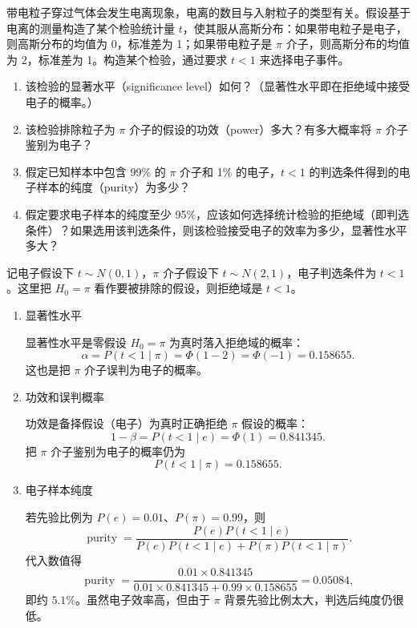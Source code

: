 ﻿


\begin{question}
带电粒子穿过气体会发生电离现象，电离的数目与入射粒子的类型有关。假设基于电离的测量构造了某个检验统计量
\(t\)，使其服从高斯分布：如果带电粒子是电子，则高斯分布的均值为
0，标准差为 1；如果带电粒子是 \(\pi\) 介子，则高斯分布的均值为
2，标准差为 1。构造某个检验，通过要求 \(t<1\) 来选择电子事件。

\begin{enumerate}
\item 该检验的显著水平（significance
level）如何？（显著性水平即在拒绝域中接受电子的概率。）

\item 该检验排除粒子为 \(\pi\)
介子的假设的功效（power）多大？有多大概率将 \(\pi\) 介子鉴别为电子？

\item 假定已知样本中包含 99\% 的 \(\pi\) 介子和 1\% 的电子，\(t<1\)
的判选条件得到的电子样本的纯度（purity）为多少？

\item 假定要求电子样本的纯度至少
95\%，应该如何选择统计检验的拒绝域（即判选条件）？如果选用该判选条件，则该检验接受电子的效率为多少，显著性水平多大？
\end{enumerate}
\begin{solution}
记电子假设下 \(t\sim N(0,1)\)，\(\pi\) 介子假设下
\(t\sim N(2,1)\)，电子判选条件为 \(t<1\)。这里把
\(H_0=\pi\) 看作要被排除的假设，则拒绝域是 \(t<1\)。

\begin{enumerate}
\item 显著性水平

显著性水平是零假设 \(H_0=\pi\) 为真时落入拒绝域的概率：
\[
\alpha=P(t<1\mid\pi)=\Phi(1-2)=\Phi(-1)=0.158655.
\]
这也是把 \(\pi\) 介子误判为电子的概率。

\item 功效和误判概率

功效是备择假设（电子）为真时正确拒绝 \(\pi\) 假设的概率：
\[
1-\beta=P(t<1\mid e)=\Phi(1)=0.841345.
\]
把 \(\pi\) 介子鉴别为电子的概率仍为
\[
P(t<1\mid\pi)=0.158655.
\]

\item 电子样本纯度

若先验比例为 \(P(e)=0.01\)、\(P(\pi)=0.99\)，则
\[
\operatorname{purity}
=\frac{P(e)P(t<1\mid e)}{P(e)P(t<1\mid e)+P(\pi)P(t<1\mid\pi)}.
\]
代入数值得
\[
\operatorname{purity}
=\frac{0.01\times0.841345}{0.01\times0.841345+0.99\times0.158655}
=0.05084,
\]
即约 \(5.1\%\)。虽然电子效率高，但由于 \(\pi\) 背景先验比例太大，判选后纯度仍很低。


\end{enumerate}
\end{solution}
\end{question}
